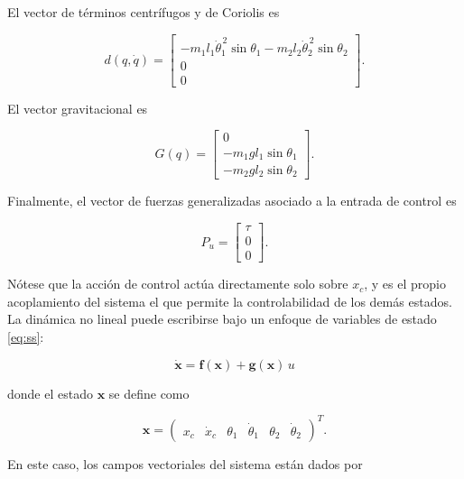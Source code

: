 \documentclass[conference]{IEEEtran}
\begin{document}
El vector de términos centrífugos y de Coriolis es

\begin{equation}
d(q,\dot q)=
\begin{bmatrix}
- m_1 l_1 \dot{\theta}_1^{\,2}\sin\theta_1
- m_2 l_2 \dot{\theta}_2^{\,2}\sin\theta_2
\\
0
\\
0
\end{bmatrix}.
\end{equation}

El vector gravitacional es

\begin{equation}
G(q)=
\begin{bmatrix}
0
\\
- m_1 g l_1 \sin\theta_1
\\
- m_2 g l_2 \sin\theta_2
\end{bmatrix}.
\end{equation}

Finalmente, el vector de fuerzas generalizadas asociado a la entrada de control es

\begin{equation}
P_u=
\begin{bmatrix}
\tau
\\
0
\\
0
\end{bmatrix}.
\end{equation}

Nótese que la acción de control actúa directamente solo sobre $x_c$, y es el propio acoplamiento del sistema el que permite la controlabilidad de los demás estados.\\

La dinámica no lineal puede escribirse bajo un enfoque de variables de estado \eqref{eq:ss}: 

\begin{equation}
	\dot{\mathbf{x}} = \mathbf{f}(\mathbf{x}) + \mathbf{g}(\mathbf{x})\, u
	\label{eq:ss}
\end{equation}

donde el estado $\mathbf{x}$ se define como 

\begin{equation}
	\mathbf{x} = \begin{pmatrix}
		x_c & \dot{x}_c & \theta_1 & \dot{\theta}_1 & \theta_2 & \dot{\theta}_2
	\end{pmatrix}^T.
\end{equation}

En este caso, los campos vectoriales del sistema están dados por
\end{document}
